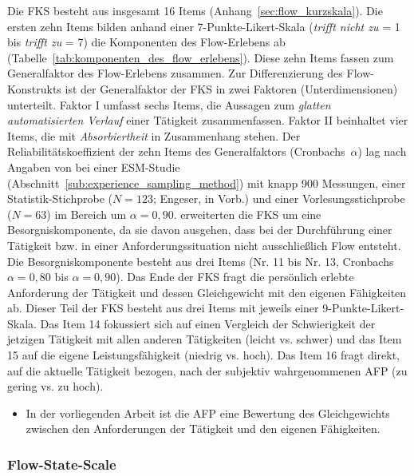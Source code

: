 Die \ac{FKS} besteht aus insgesamt 16 Items (Anhang~\ref{sec:flow_kurzskala}). Die ersten zehn Items bilden anhand einer 7-Punkte-Likert-Skala (\emph{trifft nicht zu} = 1 bis \emph{trifft zu} = 7) die Komponenten des Flow-Erlebens ab (Tabelle~\ref{tab:komponenten_des_flow_erlebens}). Diese zehn Items fassen \citet{Rheinberg2003} zum Generalfaktor des Flow-Erlebens zusammen. Zur Differenzierung des Flow-Konstrukts ist der Generalfaktor der \ac{FKS} in zwei Faktoren (Unterdimensionen) unterteilt. Faktor I umfasst sechs Items, die Aussagen zum \emph{glatten automatisierten Verlauf} einer Tätigkeit zusammenfassen. Faktor II beinhaltet vier Items, die mit \emph{Absorbiertheit} in Zusammenhang stehen. Der Reliabilitätskoeffizient der zehn Items des Generalfaktors (Cronbachs~$\alpha$) lag nach Angaben von \citet[S.~9]{Rheinberg2003} bei einer \ac{ESM}-Studie (Abschnitt~\ref{sub:experience_sampling_method}) mit knapp 900 Messungen, einer Statistik-Stichprobe ($N = 123$; Engeser, in Vorb.) und einer Vorlesungsstichprobe ($N = 63$) im Bereich um $\alpha = 0{,}90$. \citet{Rheinberg2003} erweiterten die \ac{FKS} um eine Besorgniskomponente, da sie davon ausgehen, dass bei der Durchführung einer Tätigkeit bzw. in einer Anforderungssituation nicht ausschließlich Flow entsteht. Die Besorgniskomponente besteht aus drei Items (Nr. 11 bis Nr. 13, Cronbachs $\alpha = 0{,}80$ bis $\alpha = 0{,}90$). Das Ende der \ac{FKS} fragt die persönlich erlebte Anforderung der Tätigkeit und dessen Gleichgewicht mit den eigenen Fähigkeiten ab. Dieser Teil der \ac{FKS} besteht aus drei Items mit jeweils einer 9-Punkte-Likert-Skala. Das Item 14 fokussiert sich auf einen Vergleich der Schwierigkeit der jetzigen Tätigkeit mit allen anderen Tätigkeiten (leicht vs. schwer) und das Item 15 auf die eigene Leistungsfähigkeit (niedrig vs. hoch). Das Item 16 fragt direkt, auf die aktuelle Tätigkeit bezogen, nach der subjektiv wahrgenommenen \ac{AFP} (zu gering vs. zu hoch). 
\begin{itemize}
	
	\item In der vorliegenden Arbeit ist die \ac{AFP} eine Bewertung des Gleichgewichts zwischen den Anforderungen der Tätigkeit und den eigenen Fähigkeiten.
\end{itemize}

\subsubsection{Flow-State-Scale} 

